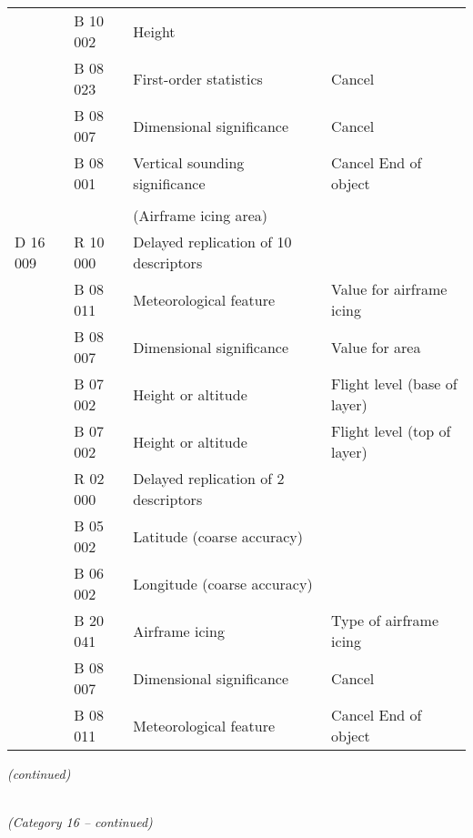 \begin{longtable}[]{@{}llll@{}}
& B 10 002 & Height &\tabularnewline
& B 08 023 & First-order statistics & Cancel\tabularnewline
& B 08 007 & Dimensional significance & Cancel\tabularnewline
& B 08 001 & Vertical sounding significance & Cancel \textbar{} End of object\tabularnewline
& & &\tabularnewline
& & (Airframe icing area) &\tabularnewline
D 16 009 & R 10 000 & Delayed replication of 10 descriptors &\tabularnewline
& B 08 011 & Meteorological feature & Value for airframe icing\tabularnewline
& B 08 007 & Dimensional significance & Value for area\tabularnewline
& B 07 002 & Height or altitude & Flight level (base of layer)\tabularnewline
& B 07 002 & Height or altitude & Flight level (top of layer)\tabularnewline
& R 02 000 & Delayed replication of 2 descriptors &\tabularnewline
& B 05 002 & Latitude (coarse accuracy) &\tabularnewline
& B 06 002 & Longitude (coarse accuracy) &\tabularnewline
& B 20 041 & Airframe icing & Type of airframe icing\tabularnewline
& B 08 007 & Dimensional significance & Cancel\tabularnewline
& B 08 011 & Meteorological feature & Cancel \textbar{} End of object\tabularnewline
\bottomrule
\end{longtable}

\emph{(continued)}

\emph{\\
(Category 16 -- continued)}

